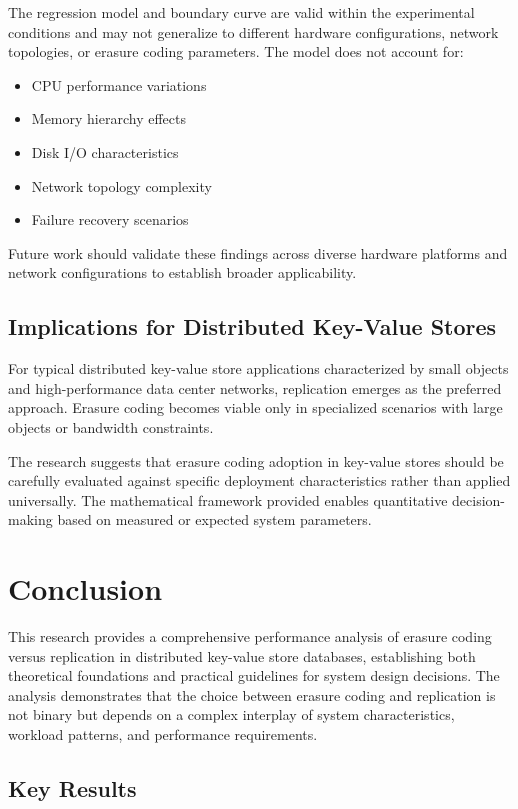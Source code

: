 The regression model and boundary curve are valid within the experimental conditions and may not generalize to different hardware configurations, network topologies, or erasure coding parameters. The model does not account for:

\begin{itemize}
\item CPU performance variations
\item Memory hierarchy effects
\item Disk I/O characteristics
\item Network topology complexity
\item Failure recovery scenarios
\end{itemize}

Future work should validate these findings across diverse hardware platforms and network configurations to establish broader applicability.

\subsection{Implications for Distributed Key-Value Stores}

For typical distributed key-value store applications characterized by small objects and high-performance data center networks, replication emerges as the preferred approach. Erasure coding becomes viable only in specialized scenarios with large objects or bandwidth constraints.

The research suggests that erasure coding adoption in key-value stores should be carefully evaluated against specific deployment characteristics rather than applied universally. The mathematical framework provided enables quantitative decision-making based on measured or expected system parameters.

\section{Conclusion}

This research provides a comprehensive performance analysis of erasure coding versus replication in distributed key-value store databases, establishing both theoretical foundations and practical guidelines for system design decisions. The analysis demonstrates that the choice between erasure coding and replication is not binary but depends on a complex interplay of system characteristics, workload patterns, and performance requirements.

\subsection{Key Results}


